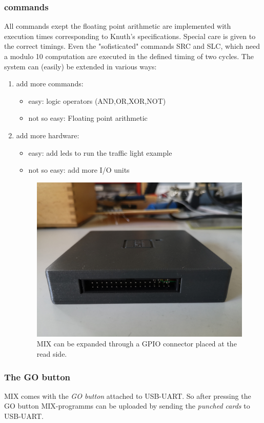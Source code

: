 \documentclass[a4paper,ngerman]{scrartcl}
\begin{document}
\subsubsection{commands}
All commands exept the floating point arithmetic are implemented with execution times corresponding to Knuth's specifications. Special care is given to the correct timings. Even the "sofisticated" commands SRC and SLC, which need a modulo 10 computation are executed in the defined timing of two cycles. The system can (easily) be extended in various ways:
\begin{enumerate}
	\item add more commands:
	\begin{itemize}
		\item easy: logic operators (AND,OR,XOR,NOT)
		\item not so easy: Floating point arithmetic
		
	\end{itemize}
	\item  add more hardware:
	\begin{itemize}
		\item easy: add leds to run the traffic light example
		\item not so easy: add more I/O units
	\end{itemize}
	
	\begin{figure}[H]
		\centering
		\includegraphics[width=0.7\linewidth]{../MIX_gpio.jpg}
		\caption{MIX can be expanded through a GPIO connector placed at the read side.}
		\label{fig:mixgpio}
	\end{figure}
\end{enumerate}
\subsubsection{The GO button}
MIX comes with the \textit{GO button} attached to USB-UART. So after pressing the GO button MIX-programms can be uploaded by sending the \textit{punched cards} to USB-UART.
\end{document}
